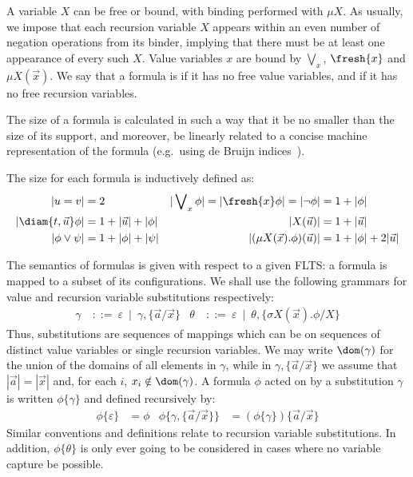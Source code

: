 A variable $X$ can be free or bound, with binding performed with $\mu X$.
 As usually, we impose that each recursion variable $X$ appears within an even number of negation operations from its binder, implying that there must be at least one appearance of every such $X$.  
Value variables $x$ are bound by $\bigvee_{x}$, $\fresh{x}$ and $\mu X(\vec x)$. 
We say that a formula is  if it has no free value variables, and  if it has no free recursion variables.

The size of a formula is calculated in such a way that it be no smaller than the size of its support, and moreover, be linearly related to a concise machine representation of the formula (e.g.\ using de Bruijn indices~\cite{DEBRUIJN1972381}).


\begin{definition}\label{def:formSize}
    The size for each formula is inductively defined as:
  \begin{align*}
    |u=v| &= 2 &
    |\bigvee\nolimits_x\phi| = |\fresh{x}\phi| = |\lnot\phi| &= 1+|\phi|\\
    |\diam{t, \vec u}\phi| &= 1 + |\vec u| + |\phi| &
    | X(\vec u)| &= 1+|\vec u|\\
    |\phi\lor\psi| &= 1+|\phi| + |\psi| &
    | (\mu X(\vec x).\phi)(\vec u)|&= 1+|\phi|+2|\vec u|
    \end{align*}
\end{definition}

The semantics of formulas is given with respect to a given FLTS: a formula is mapped to a subset of its configurations. We shall use the following grammars for value and recursion variable substitutions respectively:
\begin{align*}
\gamma\ &::=\ \varepsilon\ \mid\ \gamma,\{\vec a/\vec x\} &
\theta\ &::=\ \varepsilon\  \mid\ \theta,\{\sigma X(\vec x).\phi/X\}
\end{align*}
Thus, substitutions are sequences of mappings which can be on sequences of distinct value variables or single recursion variables.
We may write $\dom(\gamma)$ for the union of the domains of all elements in $\gamma$, while in $\gamma,\{\vec a/\vec x\}$ we assume that $|\vec a|=|\vec x|$ and, for each $i$, $x_i\notin\dom(\gamma)$. A formula $\phi$ acted on by a substitution $\gamma$ is written $\phi\{\gamma\}$ and defined recursively by:
\begin{align*}
  \phi\{\varepsilon\} &= \phi &
  \phi\{\gamma,\{\vec a/\vec x\}\} &=  (\phi\{\gamma\})\{\vec a/\vec x\}
\end{align*}
Similar conventions and definitions relate to recursion variable substitutions.
In addition, $\phi\{\theta\}$ is only ever going to be considered in cases where no variable capture be possible.

